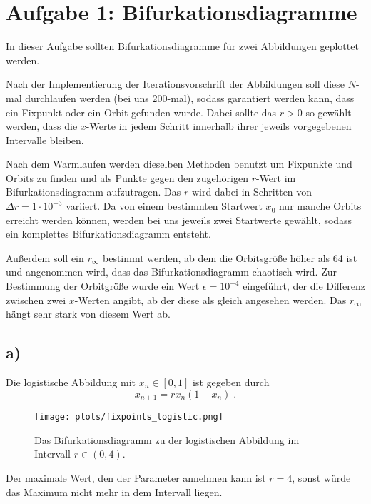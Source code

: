 \newpage
\section{Aufgabe 1: Bifurkationsdiagramme}
\label{sec:auf1}
In dieser Aufgabe sollten Bifurkationsdiagramme für zwei Abbildungen geplottet werden.

Nach der Implementierung der Iterationsvorschrift der Abbildungen soll diese $N$-mal durchlaufen werden (bei uns 200-mal), sodass garantiert werden kann, dass ein Fixpunkt oder ein Orbit gefunden wurde. Dabei sollte das $r>0$ so gewählt werden, dass die $x$-Werte in jedem Schritt innerhalb ihrer jeweils vorgegebenen Intervalle bleiben.

Nach dem Warmlaufen werden dieselben Methoden benutzt um Fixpunkte und Orbits zu finden und als Punkte gegen den zugehörigen $r$-Wert im Bifurkationsdiagramm aufzutragen. Das $r$ wird dabei in Schritten von $\Delta r = 1 \cdot 10^{-3}$ variiert. Da von einem bestimmten Startwert $x_0$ nur manche Orbits erreicht werden können, werden bei uns jeweils zwei Startwerte gewählt, sodass ein komplettes Bifurkationsdiagramm entsteht.

Außerdem soll ein $r_{\infty}$ bestimmt werden, ab dem die Orbitsgröße höher als 64 ist und angenommen wird, dass das Bifurkationsdiagramm chaotisch wird. Zur Bestimmung der Orbitgröße wurde ein Wert $\epsilon = 10^{-4}$ eingeführt, der die Differenz zwischen zwei $x$-Werten angibt, ab der diese als gleich angesehen werden. Das $r_{\infty}$ hängt sehr stark von diesem Wert ab.

\subsection{a)}
    Die logistische Abbildung mit $x_n \in [0, 1]$ ist gegeben durch
    \begin{equation}
        x_{n+1} = r x_n (1 - x_n) \;.
    \end{equation}
    
    \begin{figure}[H]
        \centering
        \texttt{[image: plots/fixpoints\_logistic.png]} \vspace{-0.3cm}
        \caption{Das Bifurkationsdiagramm zu der logistischen Abbildung im Intervall $r \in (0, 4)$.}
        \label{fig:fixpoints_logistic}
    \end{figure}
    \FloatBarrier
    
    Der maximale Wert, den der Parameter annehmen kann ist $r=4$, sonst würde das Maximum nicht mehr in dem Intervall liegen.
    
